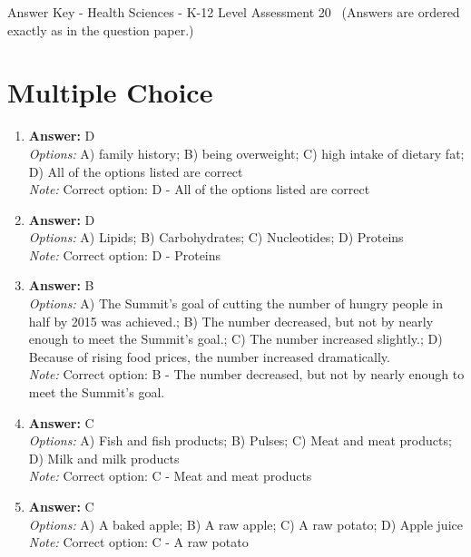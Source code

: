 \documentclass[12pt]{article}
\begin{document}
\begin{center}
Answer Key - Health Sciences - K-12 Level Assessment 20 \
\small (Answers are ordered exactly as in the question paper.)
\end{center}

\section*{Multiple Choice}
\begin{enumerate}[label=\arabic*.]
\item \textbf{Answer:} D
\\ \textit{Options:} A) family history; B) being overweight; C) high intake of dietary fat; D) All of the options listed are correct
\\ \textit{Note:} Correct option: D - All of the options listed are correct
\item \textbf{Answer:} D
\\ \textit{Options:} A) Lipids; B) Carbohydrates; C) Nucleotides; D) Proteins
\\ \textit{Note:} Correct option: D - Proteins
\item \textbf{Answer:} B
\\ \textit{Options:} A) The Summit's goal of cutting the number of hungry people in half by 2015 was achieved.; B) The number decreased, but not by nearly enough to meet the Summit's goal.; C) The number increased slightly.; D) Because of rising food prices, the number increased dramatically.
\\ \textit{Note:} Correct option: B - The number decreased, but not by nearly enough to meet the Summit's goal.
\item \textbf{Answer:} C
\\ \textit{Options:} A) Fish and fish products; B) Pulses; C) Meat and meat products; D) Milk and milk products
\\ \textit{Note:} Correct option: C - Meat and meat products
\item \textbf{Answer:} C
\\ \textit{Options:} A) A baked apple; B) A raw apple; C) A raw potato; D) Apple juice
\\ \textit{Note:} Correct option: C - A raw potato
\end{enumerate}
\end{document}
